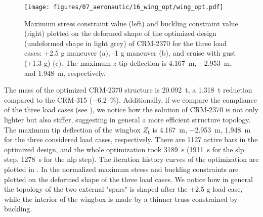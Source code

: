 \begin{figure}
    \centering
    \texttt{[image: figures/07\_aeronautic/16\_wing\_opt/wing\_opt.pdf]}
     \caption{Maximum stress constraint value (left) and buckling constraint value (right) plotted on the deformed shape of the optimized design (undeformed shape in light grey) of CRM-2370 for the three load cases: +2.5 g maneuver (a), -1 g maneuver (b), and cruise with gust (+1.3 g) (c). The maximum $z$ tip deflection is \qty{4.167}{m}, \qty{-2.953}{m}, and \qty{1.948}{m}, respectively.}
    \label{fig:07_wing_opt}
\end{figure}
The mass of the optimized CRM-2370 structure is \qty{20.092}{\tonne}, a \qty{1.318}{\tonne} reduction compared to the CRM-315 (\qty{-6.2}{\%}). Additionally, if we compare the compliance of the three load cases (see ), we notice how the solution of CRM-2370 is not only lighter but also stiffer, suggesting in general a more efficient structure topology. The maximum tip deflection of the wingbox $Z_\text{t}$ is \qty{4.167}{m}, \qty{-2.953}{m}, \qty{1.948}{m} for the three considered load cases, respectively. There are 1127 active bars in the optimized design, and the whole optimization took \qty{3189}{s} (\qty{1911}{s} for the \gls{slp} step, \qty{1278}{s} for the \gls{nlp} step). The iteration history curves of the optimization are plotted in . In  the normalized maximum stress and buckling constraints are plotted on the deformed shape of the three load cases. We notice how in general the topology of the two external "spars" is shaped after the +2.5 g load case, while the interior of the wingbox is made by a thinner truss constrained by buckling. 

